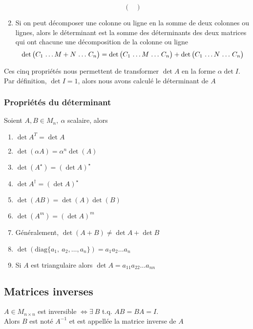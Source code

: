 \begin{enumerate}
\[\begin{pmatrix}
              \end{pmatrix}\]
    \item Si on peut décomposer une colonne ou ligne en la somme de deux colonnes ou lignes,
          alors le déterminant est la somme des déterminants des deux matrices qui ont chacune
          une décomposition de la colonne ou ligne
          \[ \det \arraycolsep=0.3\arraycolsep \begin{pmatrix}
                  C_1 & \ldots M + N & \ldots & C_n
              \end{pmatrix} = \det \begin{pmatrix}
                  C_1 & \ldots M & \ldots & C_n
              \end{pmatrix} + \det \begin{pmatrix}
                  C_1 & \ldots N & \ldots & C_n
              \end{pmatrix} \]
\end{enumerate}
Ces cinq propriétés nous permettent de transformer $\det A$ en la forme $\alpha \det I$. Par définition, 
$\det I = 1$, alors nous avons calculé le déterminant de $A$

\subsubsection{Propriétés du déterminant}
Soient $A, B \in M_n, \ \alpha$ scalaire, alors \begin{enumerate}
    \item $\det A^T = \det A$
    \item $\det(\alpha A) = \alpha^n \det(A)$
    \item $\det (A^\star) = (\det A)^\star$
    \item $\det A^\dagger = (\det A)^\star$
    \item $\det(AB) = \det(A) \det(B)$
    \item $\det(A^m) = (\det A)^m$
    \item Généralement, $\det(A + B) \neq \det A + \det B$
    \item $\det(\text{diag}\{a_1, \ a_2, \ldots, a_n \}) = a_1 a_2 \dots a_n$
    \item Si $A$ est triangulaire alors $\det A = a_{11} a_{22} \dots a_{nn}$
\end{enumerate}

\subsection{Matrices inverses}
\begin{definition}
    $A \in M_{n \times n}$ est inversible $\iff \exists \ B$ t.q. $AB = BA = I$. \\
    Alors $B$ est noté $A^{-1}$ et est appellée la matrice inverse de $A$
\end{definition}

